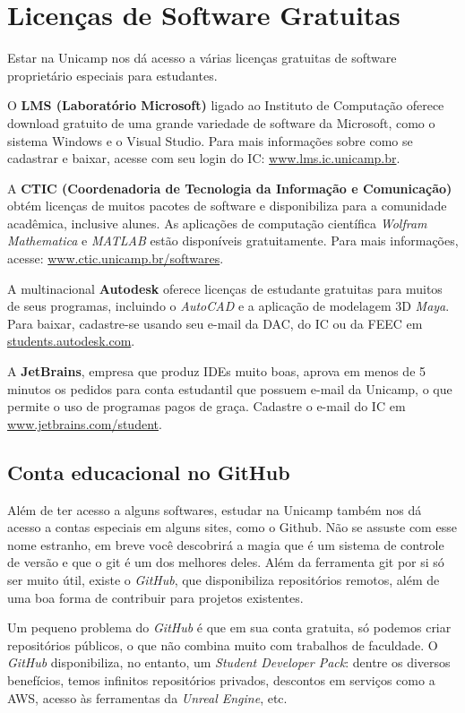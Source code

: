 \section{Licenças de Software Gratuitas}

Estar na Unicamp nos dá acesso a várias licenças gratuitas de software proprietário  especiais para estudantes. 

O \textbf{LMS (Laboratório Microsoft)} ligado ao Instituto de Computação oferece download  gratuito de uma grande variedade de software da Microsoft, como o sistema Windows e  o Visual Studio. Para mais informações sobre como se cadastrar e baixar, acesse com seu  login do IC: \url{www.lms.ic.unicamp.br}. 

A \textbf{CTIC (Coordenadoria de Tecnologia da Informação e Comunicação)} obtém licenças  de muitos pacotes de software e disponibiliza para a comunidade acadêmica, inclusive  alunes. As aplicações de computação científica \textit{Wolfram Mathematica} e \textit{MATLAB} estão  disponíveis gratuitamente. Para mais informações, acesse: \url{www.ctic.unicamp.br/softwares}. 

A multinacional \textbf{Autodesk} oferece licenças de estudante gratuitas para muitos de  seus programas, incluindo o \textit{AutoCAD} e a aplicação de modelagem 3D \textit{Maya}. Para baixar,  cadastre-se usando seu e-mail da DAC, do IC ou da FEEC em \url{students.autodesk.com}. 

A \textbf{JetBrains}, empresa que produz IDEs muito boas, aprova em menos de 5 minutos os  pedidos para conta estudantil que possuem e-mail da Unicamp, o que permite o uso de  programas pagos de graça. Cadastre o e-mail do IC em \url{www.jetbrains.com/student}.

\subsection{Conta educacional no GitHub}

Além de ter acesso a alguns softwares, estudar na Unicamp também nos dá acesso a contas especiais em alguns sites, como o Github. Não se assuste com esse nome estranho, em breve você descobrirá a magia que é um sistema de controle de versão e que o git é um dos melhores deles. Além da ferramenta git por si só ser muito útil, existe o \textit{GitHub}, que disponibiliza repositórios remotos, além de uma boa forma de contribuir para projetos existentes.

Um pequeno problema do \textit{GitHub} é que em sua conta gratuita, só podemos criar  repositórios públicos, o que não combina muito com trabalhos de faculdade. O \textit{GitHub}  disponibiliza, no entanto, um \textit{Student Developer Pack}: dentre os diversos benefícios,  temos infinitos repositórios privados, descontos em serviços como a AWS, acesso às  ferramentas da \textit{Unreal Engine}, etc.

